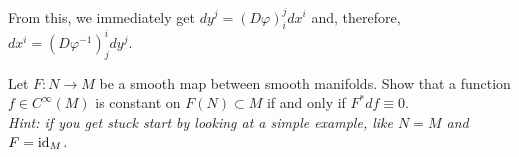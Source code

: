 \begin{example}
  From this, we immediately get $dy^j = (D\varphi)_i^j dx^i$ and, therefore, $dx^i =  (D\varphi^{-1})_j^i dy^j$.
\end{example}

\begin{exercise}
  Let $F:N\to M$ be a smooth map between smooth manifolds.
  Show that a function $f\in C^\infty(M)$ is constant on $F(N)\subset M$ if and only if $F^* df \equiv 0$.\\
  \textit{\small Hint: if you get stuck start by looking at a simple example, like $N=M$ and $F=\operatorname{id}_M$.}
\end{exercise}
